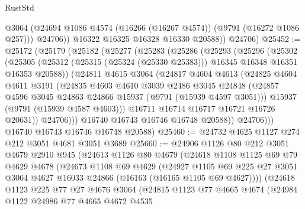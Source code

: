 \begin{lexlean}{RustStd}
\begin{coremodule}
              @3064
              (@24694 @1086 @4574 (@16266 (@16267 @4574)) (@9791 (@16272 @1086 @257)))
              @24706))
          @16322
          @16325
          @16328
          @16330
          @20588))
      @24706)
@25452 := @25172
    (@25179
      (@25182
        (@25277
          (@25283
            (@25286
              (@25293
                (@25296
                  (@25302
                    (@25305
                      (@25312 (@25315 (@25324 (@25330 @25383))) @16345 @16348 @16351 @16353 @20588))
                    (@24811
                      @4615
                      @3064
                      (@24817
                        @4604
                        @4613
                        (@24825
                          @4604
                          @4611
                          @3191
                          (@24835
                            @4603
                            @4610
                            @3039
                            @2486
                            @3045
                            @24848
                            (@24857 @4596 @3045 @24863 @24866 @15937 (@9791 (@15939 @4597 @3051)))
                            @15937
                            (@9791 (@15939 @4587 @4603)))
                          @16711
                          @16714
                          @16717
                          @16721
                          @16726
                          @20631))
                      @24706)))
                @16740
                @16743
                @16746
                @16748
                @20588))
            @24706)))
      @16740
      @16743
      @16746
      @16748
      @20588)
@25460 := @24732 @4625 @1127 @274 @212 @3051 @4681 @3051 @3689
@25660 := @24906
    @1126
    @80
    @212
    @3051
    @4679
    @2910
    @945
    (@24613
      @1126
      @80
      @4679
      (@24618
        @1108
        @1125
        @69
        @79
        @4629
        @4678
        (@24673
          @1108
          @69
          @4629
          (@24927
            @1105
            @69
            @225
            @27
            @3051
            @3064
            @4627
            @16033
            @24866
            (@16163 (@16165 @1105 @69 @4627))))
        (@24618
          @1123
          @225
          @77
          @27
          @4676
          @3064
          (@24815
            @1123
            @77
            @4665
            @4674
            (@24984
              @1122
              @24986
              @77
              @4665
              @4672
              @4535

\end{coremodule}
\end{lexlean}
